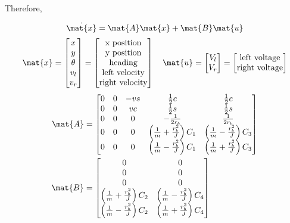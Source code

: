 Therefore,
\begin{theorem}
  \begin{equation*}
    \dot{\mat{x}} = \mat{A}\mat{x} + \mat{B}\mat{u}
  \end{equation*}
  \begin{equation*}
    \mat{x} =
    \begin{bmatrix}
      x \\
      y \\
      \theta \\
      v_l \\
      v_r
    \end{bmatrix} =
    \begin{bmatrix}
      \text{x position} \\
      \text{y position} \\
      \text{heading} \\
      \text{left velocity} \\
      \text{right velocity}
    \end{bmatrix}
    \quad
    \mat{u} =
    \begin{bmatrix}
      V_l \\
      V_r
    \end{bmatrix} =
    \begin{bmatrix}
      \text{left voltage} \\
      \text{right voltage}
    \end{bmatrix}
  \end{equation*}
  \begin{align}
    \mat{A} &=
    \begin{bmatrix}
      0 & 0 & -vs & \frac{1}{2}c & \frac{1}{2}c \\
      0 & 0 & vc & \frac{1}{2}s & \frac{1}{2}s \\
      0 & 0 & 0 & -\frac{1}{2r_b} & \frac{1}{2r_b} \\
      0 & 0 & 0 & \left(\frac{1}{m} + \frac{r_b^2}{J}\right) C_1 &
        \left(\frac{1}{m} - \frac{r_b^2}{J}\right) C_3 \\
      0 & 0 & 0 & \left(\frac{1}{m} - \frac{r_b^2}{J}\right) C_1 &
        \left(\frac{1}{m} + \frac{r_b^2}{J}\right) C_3
    \end{bmatrix} \\
    \mat{B} &=
    \begin{bmatrix}
      0 & 0 \\
      0 & 0 \\
      0 & 0 \\
      \left(\frac{1}{m} + \frac{r_b^2}{J}\right) C_2 &
      \left(\frac{1}{m} - \frac{r_b^2}{J}\right) C_4 \\
      \left(\frac{1}{m} - \frac{r_b^2}{J}\right) C_2 &
      \left(\frac{1}{m} + \frac{r_b^2}{J}\right) C_4
    \end{bmatrix}
  \end{align}


\end{theorem}
